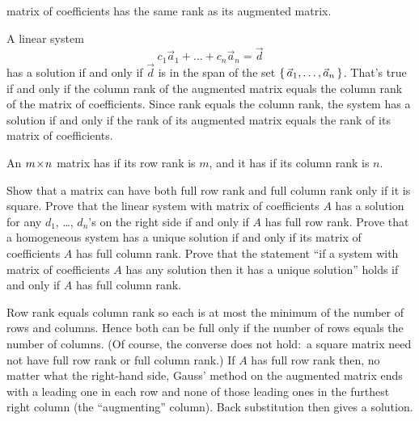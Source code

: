 \begin{exercises}
    matrix of coefficients has the same rank as its augmented matrix.
    \begin{answer}
      A linear system
      \begin{equation*}
        c_1\vec{a}_1+\dots+c_n\vec{a}_n=\vec{d}
      \end{equation*}
      has a solution if and only if \( \vec{d} \) is in the span of
      the set \( \mbox{$\{\,\vec{a}_1,\dots,\vec{a}_n\,\}$} \).
      That's true if and only if the column rank of the augmented matrix
      equals the column rank of the matrix of coefficients.
      Since rank equals the column rank, the system has a solution if and
      only if the rank of its augmented matrix equals the rank of its matrix
      of coefficients.  
    \end{answer}
  \item 
    An \( m \! \times \! n \) matrix has 
    if its row rank
    is \( m \), and it has 
    if its column rank is \( n \).
    \begin{exparts}
      \partsitem Show that 
        a matrix can have both full row rank and full column rank
        only if it is square.
      \partsitem Prove that the linear system with matrix of
        coefficients \( A \)
        has a solution for any \( d_1 \), \ldots, \( d_n \)'s on the 
        right side if and only if \( A \) has full row rank.
      \partsitem Prove that a homogeneous system
        has a unique solution if and only if its matrix of coefficients
        $A$ has full column rank.
      \partsitem Prove that the statement 
       ``if a system with matrix of coefficients \( A \) has
        any solution then it has a unique solution'' holds
        if and only if \( A \) has full column rank.
    \end{exparts}
    \begin{answer}
      \begin{exparts}
        \partsitem Row rank equals column rank so each is at most the 
          minimum of the number of rows and columns.
          Hence both can be full only if the number of rows equals the number
          of columns.
          (Of course, the converse does not hold:~a 
          square matrix need not have full row rank or full column rank.)
        \partsitem If \( A \) has full row rank then, no matter what 
          the right-hand
          side, Gauss' method on the augmented matrix ends with a leading
          one in each row and none of those leading ones in the
          furthest right column (the ``augmenting'' column).
          Back substitution then gives a solution.


\end{exparts}
\end{answer}
\end{exercises}
